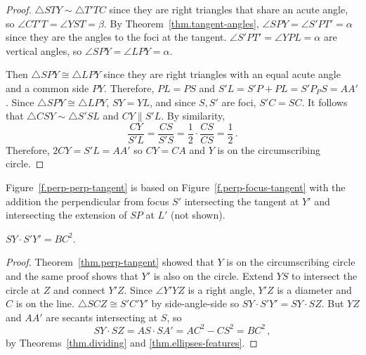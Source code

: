 
\begin{proof}

$\triangle STY\sim\triangle T'TC$ since they are right triangles that share an acute angle, so $\angle CT'T=\angle YST=\beta$. By Theorem~\ref{thm.tangent-angles}, $\angle SPY=\angle S'PT'=\alpha$ since they are the angles to the foci at the tangent. $\angle S'PT'=\angle YPL=\alpha$ are vertical angles, so $\angle SPY=\angle LPY=\alpha$. 

Then $\triangle SPY\cong\triangle LPY$ since they are right triangles with an equal acute angle and a common side $PY$. Therefore, $PL=PS$ and $S'L=S'P+PL=S'P_PS=AA'$. Since $\triangle SPY\cong\triangle LPY$, $SY=YL$, and since $S,S'$ are foci, $S'C=SC$. It follows that $\triangle CSY\sim \triangle S'SL$ and $CY\parallel S'L$. By similarity,
\[
\frac{CY}{S'L}=\frac{CS}{S'S}=\frac{1}{2}\cdot\frac{CS}{CS}=\frac{1}{2}\,.
\]
Therefore, $2CY=S'L=AA'$ so $CY=CA$ and $Y$ is on the circumscribing circle.\hqed
\end{proof}


Figure~\ref{f.perp-perp-tangent} is based on Figure~\ref{f.perp-focus-tangent} with the addition the perpendicular from focus $S'$ intersecting the tangent at $Y'$ and intersecting the extension of $SP$ at $L'$ (not shown).

\begin{theorem}\label{thm.perp-perp-tangent}
$SY\cdot S'Y' = BC^2$.
\end{theorem}

\begin{proof}
Theorem~\ref{thm.perp-tangent} showed that $Y$ is on the circumscribing circle and the same proof shows that $Y'$ is also on the circle. Extend $YS$ to intersect the circle at $Z$ and connect $Y'Z$. Since $\angle Y'YZ$ is a right angle, $Y'Z$ is a diameter and $C$ is on the line. $\triangle SCZ \cong S'C'Y'$ by side-angle-side so $SY\cdot S'Y' = SY \cdot SZ$. But $YZ$ and $AA'$ are secants intersecting at $S$, so
\[
SY\cdot SZ = AS\cdot SA' = AC^2-CS^ 2 = BC^2\,,
\]
by Theorems~\ref{thm.dividing} and \ref{thm.ellipses-features}.\hqed
\end{proof}


